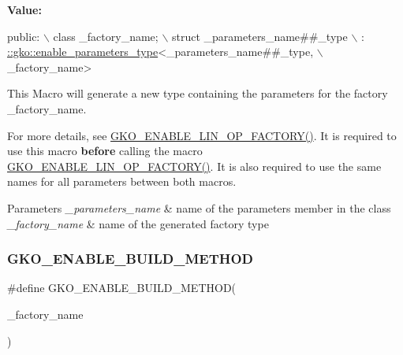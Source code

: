 {\bfseries Value\+:}
\begin{DoxyCode}
\textcolor{keyword}{public}:                                                                \(\backslash\)
    class \_factory\_name;                                               \(\backslash\)
    struct \_parameters\_name##\_type                                     \(\backslash\)
        : \hyperlink{structgko_1_1enable__parameters__type}{::gko::enable\_parameters\_type}<\_parameters\_name##\_type,       \(\backslash\)
                                        \_factory\_name>
\end{DoxyCode}


This Macro will generate a new type containing the parameters for the factory {\ttfamily \+\_\+factory\+\_\+name}. 

For more details, see \hyperlink{group__LinOp_ga8e0af90ec2414b768266f77cedffc309}{G\+K\+O\+\_\+\+E\+N\+A\+B\+L\+E\+\_\+\+L\+I\+N\+\_\+\+O\+P\+\_\+\+F\+A\+C\+T\+O\+R\+Y()}. It is required to use this macro {\bfseries before} calling the macro \hyperlink{group__LinOp_ga8e0af90ec2414b768266f77cedffc309}{G\+K\+O\+\_\+\+E\+N\+A\+B\+L\+E\+\_\+\+L\+I\+N\+\_\+\+O\+P\+\_\+\+F\+A\+C\+T\+O\+R\+Y()}. It is also required to use the same names for all parameters between both macros.


\begin{DoxyParams}{Parameters}
{\em \+\_\+parameters\+\_\+name} & name of the parameters member in the class \\
\hline
{\em \+\_\+factory\+\_\+name} & name of the generated factory type \\
\hline
\end{DoxyParams}
\mbox{\label{group__LinOp_ga521f65604cc4cf427dcb2ecfa49b757c}} 
\subsubsection{\texorpdfstring{G\+K\+O\+\_\+\+E\+N\+A\+B\+L\+E\+\_\+\+B\+U\+I\+L\+D\+\_\+\+M\+E\+T\+H\+OD}{GKO\_ENABLE\_BUILD\_METHOD}}
{\footnotesize\ttfamily \#define G\+K\+O\+\_\+\+E\+N\+A\+B\+L\+E\+\_\+\+B\+U\+I\+L\+D\+\_\+\+M\+E\+T\+H\+OD(\begin{DoxyParamCaption}\item[{}]{\+\_\+factory\+\_\+name }\end{DoxyParamCaption})}

